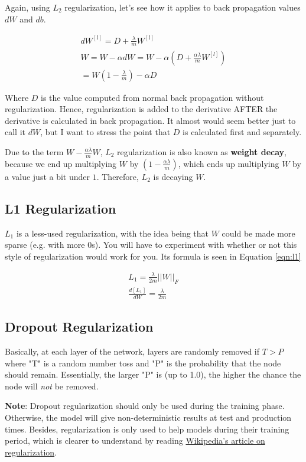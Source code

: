 \documentclass{article}
\begin{document}
Again, using $L_2$ regularization, let's see how it applies to back propagation values $dW$ and $db$.

\begin{gather}
dW^{[l]} = D + \frac{\lambda}{m} W^{[l]} \\
W = W - \alpha dW = W - \alpha (D + \frac{\alpha \lambda}{m} W^{[l]}) \\
= W(1 - \frac{\lambda}{m}) - \alpha D
\end{gather}

Where $D$ is the value computed from normal back propagation without regularization.  Hence, regularization is added to the derivative AFTER the derivative is calculated in back propagation.  It almost would seem better just to call it $dW$, but I want to stress the point that $D$ is calculated first and separately.

Due to the term $W - \frac{\alpha\lambda}{m} W$, $L_2$ regularization is also known as \textbf{weight decay}, because we end up multiplying $W$ by $(1 - \frac{\alpha\lambda}{m})$, which ends up multiplying $W$ by a value just a bit under $1$.  Therefore, $L_2$ is decaying $W$.

\subsection{L1 Regularization}

$L_{1}$ is a less-used regularization, with the idea being that $W$ could be made more sparse (e.g. with more 0s).  You will have to experiment with whether or not this style of regularization would work for you.  Its formula is seen in Equation \ref{eqn:l1}

\begin{gather} \label{eqn:l1}
L_{1} = \frac{\lambda}{2m} ||W||_{F} \\
\frac{d[L_{1}]}{dW} = \frac{\lambda}{2m}
\end{gather}

\subsection{Dropout Regularization}

Basically, at each layer of the network, layers are randomly removed if $T > P$ where "T" is a random number toss and "P" is the probability that the node should remain.  Essentially, the larger "P" is (up to 1.0), the higher the chance the node will \textit{not} be removed.

\textbf{Note}: Dropout regularization should only be used during the training phase.  Otherwise, the model will give non-deterministic results at test and production times.  Besides, regularization is only used to help models during their training period, which is clearer to understand by reading \href{https://en.wikipedia.org/wiki/Regularization_(mathematics)}{Wikipedia's article on regularization}.
\end{document}
